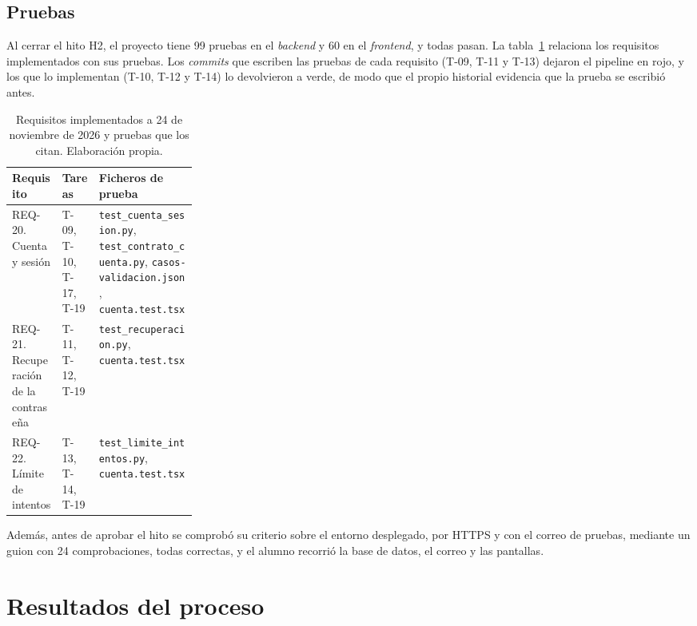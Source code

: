 \subsection{Pruebas}\label{subsec:Pruebas}

Al cerrar el hito H2, el proyecto tiene 99 pruebas en el \emph{backend} y 60 en el \emph{frontend}, y todas pasan. La tabla~\ref{tab:ReqPrueba} relaciona los requisitos implementados con sus pruebas. Los \emph{commits} que escriben las pruebas de cada requisito (T-09, T-11 y T-13) dejaron el pipeline en rojo, y los que lo implementan (T-10, T-12 y T-14) lo devolvieron a verde, de modo que el propio historial evidencia que la prueba se escribió antes.

\begin{table}[htbp]
	\centering
	\small
	\caption{Requisitos implementados a 24 de noviembre de 2026 y pruebas que los citan. Elaboración propia.}
	\label{tab:ReqPrueba}
	\begin{tabularx}{\linewidth}{@{}>{\raggedright\arraybackslash}p{0.27\linewidth}l>{\raggedright\arraybackslash}X@{}}
		\toprule
		\textbf{Requisito} & \textbf{Tareas} & \textbf{Ficheros de prueba} \\
		\midrule
		REQ-20. Cuenta y sesión & T-09, T-10, T-17, T-19 & \texttt{test\_cuenta\_sesion.py}, \texttt{test\_contrato\_cuenta.py}, \texttt{casos-validacion.json}, \texttt{cuenta.test.tsx} \\
		REQ-21. Recuperación de la contraseña & T-11, T-12, T-19 & \texttt{test\_recuperacion.py}, \texttt{cuenta.test.tsx} \\
		REQ-22. Límite de intentos & T-13, T-14, T-19 & \texttt{test\_limite\_intentos.py}, \texttt{cuenta.test.tsx} \\
		\bottomrule
	\end{tabularx}
\end{table}

Además, antes de aprobar el hito se comprobó su criterio sobre el entorno desplegado, por HTTPS y con el correo de pruebas, mediante un guion con 24 comprobaciones, todas correctas, y el alumno recorrió la base de datos, el correo y las pantallas.


\section{Resultados del proceso}\label{sec:ResultadosProceso}
